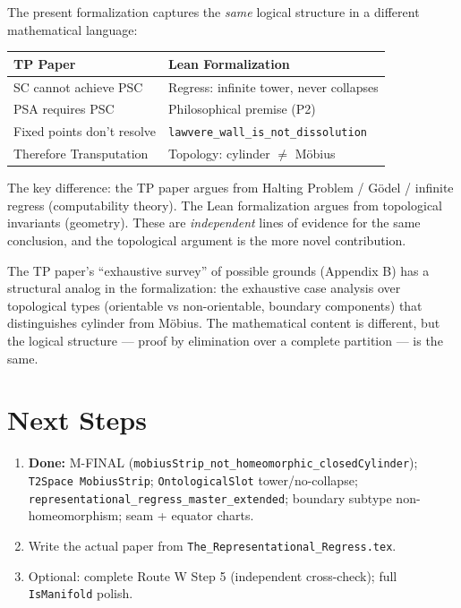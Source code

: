 \documentclass[11pt]{article}
\begin{document}
The present formalization captures the \emph{same} logical structure in a
different mathematical language:

\begin{center}
\begin{tabular}{ll}
\textbf{TP Paper} & \textbf{Lean Formalization} \\
\hline
SC cannot achieve PSC & Regress: infinite tower, never collapses \\
PSA requires PSC & Philosophical premise (P2) \\
Fixed points don't resolve & \texttt{lawvere\_wall\_is\_not\_dissolution} \\
Therefore Transputation & Topology: cylinder $\neq$ M\"obius \\
\end{tabular}
\end{center}

The key difference: the TP paper argues from Halting Problem / G\"odel / infinite
regress (computability theory). The Lean formalization argues from topological
invariants (geometry). These are \emph{independent} lines of evidence for the
same conclusion, and the topological argument is the more novel contribution.

The TP paper's ``exhaustive survey'' of possible grounds (Appendix B) has a
structural analog in the formalization: the exhaustive case analysis over
topological types (orientable vs non-orientable, boundary components) that
distinguishes cylinder from M\"obius. The mathematical content is different,
but the logical structure --- proof by elimination over a complete partition ---
is the same.

\section{Next Steps}

\begin{enumerate}
\item \textbf{Done:} M-FINAL (\texttt{mobiusStrip\_not\_homeomorphic\_closedCylinder}); \texttt{T2Space MobiusStrip}; \texttt{OntologicalSlot} tower/no-collapse; \texttt{representational\_regress\_master\_extended}; boundary subtype non-homeomorphism; seam + equator charts.
\item Write the actual paper from \texttt{The\_Representational\_Regress.tex}.
\item Optional: complete Route W Step 5 (independent cross-check); full \texttt{IsManifold} polish.
\end{enumerate}
\end{document}
